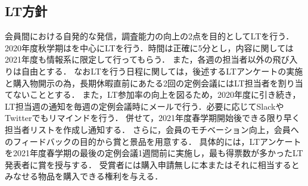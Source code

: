 \subsection*{LT方針}


会員間における自発的な発信，調査能力の向上の2点を目的としてLTを行う．
2020年度秋学期は\firstGrade{}を中心にLTを行う．時間は正確に5分とし，内容に関しては2021年度も情報系に限定して行ってもらう．
また，各週の担当者以外の飛び入りは自由とする．
なおLTを行う日程に関しては，後述するLTアンケートの実施と購入物開示の為，長期休暇直前にあたる2回の定例会議にはLT担当者を割り当てないこととする．
また，LT参加率の向上を図るため，2020年度に引き続き，LT担当週の通知を毎週の定例会議時にメールで行う．必要に応じてSlackやTwitterでもリマインドを行う．
併せて，2021年度春学期開始後できる限り早く担当者リストを作成し通知する．
さらに，会員のモチベーション向上，会員へのフィードバックの目的から賞と景品を用意する．
具体的には，LTアンケートを2021年度春学期の最後の定例会議1週間前に実施し，最も得票数が多かったLT発表者に賞を授与する．
受賞者には購入申請無しに本またはそれに相当するとみなせる物品を購入できる権利を与える．
